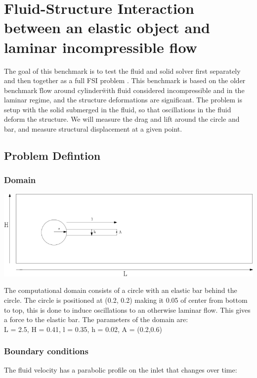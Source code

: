 
\section*{Fluid-Structure Interaction between an elastic object and laminar incompressible flow}
The goal of this benchmark is to test the fluid and solid solver first separately and then together as a full FSI problem \cite{Hron2006a}. This benchmark is based on the older benchmark \" flow around cylinder\" with fluid considered incompressible and in the laminar regime, and the structure deformations are significant. The problem is setup with the solid submerged in the fluid, so that oscillations in the fluid deform the structure. We will measure the drag and lift around the circle and bar, and measure structural displacement at a given point. 

\subsection*{Problem Defintion}
\subsubsection*{Domain}
\begin{center}
\includegraphics[scale=0.4]{./Verification_Validation/Hron_Turek/Domain_drawing.png}
\end{center}
The computational domain consists of a circle with an elastic bar behind the circle. The circle is positioned at (0.2, 0.2) making it 0.05 of center from bottom to top, this is done to induce oscillations to an otherwise laminar flow. 
This gives a force to the elastic bar. The parameters of the domain are:\\
L = 2.5, H = 0.41, l = 0.35, h = 0.02, A = (0.2,0.6) \\

\subsubsection*{Boundary conditions}
The fluid velocity has a parabolic profile on the inlet that changes over time:\\

